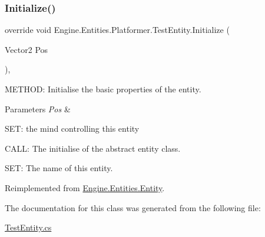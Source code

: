 \subsubsection{\texorpdfstring{Initialize()}{Initialize()}}
{\footnotesize\ttfamily override void Engine.\+Entities.\+Platformer.\+Test\+Entity.\+Initialize (\begin{DoxyParamCaption}\item[{Vector2}]{Pos }\end{DoxyParamCaption})\hspace{0.3cm}{\ttfamily [inline]}, {\ttfamily [virtual]}}



M\+E\+T\+H\+OD\+: Initialise the basic properties of the entity. 


\begin{DoxyParams}{Parameters}
{\em Pos} & \\
\hline
\end{DoxyParams}
S\+ET\+: the mind controlling this entity

C\+A\+LL\+: The initialise of the abstract entity class.

S\+ET\+: The name of this entity. 

Reimplemented from \hyperlink{a00314_aa1425aeeac379c5141e7560b84850b3d}{Engine.\+Entities.\+Entity}.



The documentation for this class was generated from the following file\+:\begin{DoxyCompactItemize}
\item 
\hyperlink{a00029}{Test\+Entity.\+cs}\end{DoxyCompactItemize}
